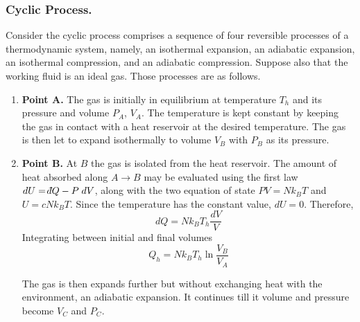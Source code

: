 \documentclass[../../../Main.tex]{subfiles}
\begin{document}
\subsubsection*{Cyclic Process.} Consider the cyclic process comprises a sequence of four reversible processes of a thermodynamic system, namely, an isothermal expansion, an adiabatic expansion, an isothermal compression, and an adiabatic compression. Suppose also that the working fluid is an ideal gas. Those processes are as follows.

\begin{enumerate}
    \item \textbf{Point A.} The gas is initially in equilibrium at temperature $T_h$ and its pressure and volume $P_A $, $V_A$. The temperature is kept constant by keeping the gas in contact with a heat reservoir at the desired temperature. The gas is then let to expand isothermally to volume $V_B$ with $P_B$ as its pressure.

    \item \textbf{Point B.} At $B$ the gas is isolated from the heat reservoir. The amount of heat absorbed along $A\rightarrow B$ may be evaluated using the first law $dU=\dbar Q-P\;dV$, along with the two equation of state $PV=Nk_BT$ and $U=cNk_BT$. Since the temperature has the constant value, $dU=0$. Therefore,
    \begin{equation*}
        dQ=Nk_BT_h  \frac{dV}{V}
    \end{equation*}
    Integrating between initial and final volumes
    \begin{equation*}
        Q_h=Nk_BT_h \ln \frac{V_B}{V_A}
    \end{equation*}

    The gas is then expands further but without exchanging heat with the environment, an adiabatic expansion. It continues till it volume and pressure become $V_C$ and $P_C$.


\end{enumerate}
\end{document}
